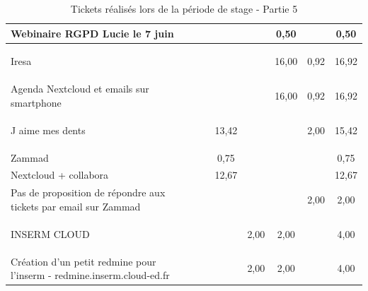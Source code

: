 \documentclass[12pt, a4paper, twoside]{article}
\begin{document}
\begin{table}[!ht]
\begin{adjustbox}{max width=\textwidth}
\begin{tabular}{|p{6cm}|c|c|c|c|c|c|c|}
        Webinaire RGPD Lucie le 7 juin &  &  &  &  & 0,50 &  & 0,50 \\ \hline
        \begin{code}Iresa\end{code} &  &  &  &  & 16,00 & 0,92 & 16,92 \\ \hline
        Agenda Nextcloud et emails sur smartphone &  &  &  &  & 16,00 & 0,92 & 16,92 \\ \hline
        \begin{code}J aime mes dents\end{code} &  &  & 13,42 &  &  & 2,00 & 15,42 \\ \hline
        Zammad &  &  & 0,75 &  &  &  & 0,75 \\ \hline
        Nextcloud + collabora &  &  & 12,67 &  &  &  & 12,67 \\ \hline
        Pas de proposition de répondre aux tickets par email sur Zammad &  &  &  &  &  & 2,00 & 2,00 \\ \hline
        \begin{code}INSERM CLOUD\end{code} &  &  &  & 2,00 & 2,00 &  & 4,00 \\ \hline
        Création d'un petit redmine pour l'inserm -  redmine.inserm.cloud-ed.fr &  &  &  & 2,00 & 2,00 &  & 4,00 \\ \hline
\end{tabular}
\end{adjustbox}
\caption{Tickets réalisés lors de la période de stage - Partie 5}
\end{table}
\end{document}
